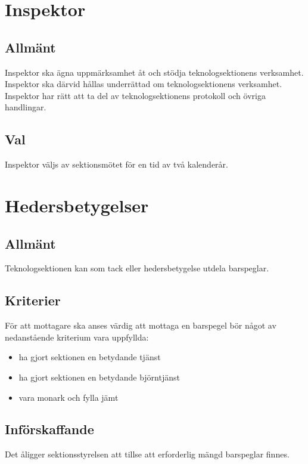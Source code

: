 \documentclass[a4paper]{dtek}
\begin{document}
\section{Inspektor}
\subsection{Allmänt}
Inspektor ska ägna uppmärksamhet åt och stödja teknologsektionens verksamhet. Inspektor ska därvid hållas underrättad om teknologsektionens verksamhet. Inspektor har rätt att ta del av teknologsektionens protokoll och övriga handlingar.
\subsection{Val}
Inspektor väljs av sektionsmötet för en tid av två kalenderår.
\newpage

\section{Hedersbetygelser}
\subsection{Allmänt}
Teknologsektionen kan som tack eller hedersbetygelse utdela barspeglar.
\subsection{Kriterier}
För att mottagare ska anses värdig att mottaga en barspegel bör något av nedanstående kriterium vara uppfyllda:
\begin{itemize}
\item ha gjort sektionen en betydande tjänst
\item ha gjort sektionen en betydande björntjänst
\item vara monark och fylla jämt
\end{itemize}
\subsection{Införskaffande}
Det åligger sektionsstyrelsen att tillse att erforderlig mängd barspeglar finnes.
\end{document}
